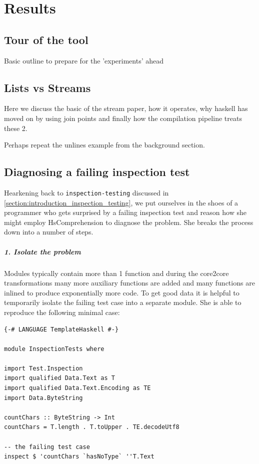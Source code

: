 \documentclass{report}
\newcommand{\mono}{\texttt}
\begin{document}
\chapter{Results}

\section{Tour of the tool}
Basic outline to prepare for the 'experiments' ahead

\section{Lists vs Streams}
Here we discuss the basic of the stream paper, how it operates, why haskell has moved on by using join points and
finally how the compilation pipeline treats these 2.

Perhaps repeat the unlines example from the background section.

\section{Diagnosing a failing inspection test}

Hearkening back to \mono{inspection-testing} discussed in \cref{section:introduction_inspection_testing}, we put
ourselves in the shoes of a programmer who gets surprised by a failing inspection test and reason how she might
employ HsComprehension to diagnose the problem. She breaks the process down into a number of steps.

\paragraph{1. Isolate the problem}
Modules typically contain more than 1 function and during the core2core transformations many more auxiliary functions are
added and many functions are inlined to produce exponentially more code. To get good data it is helpful to temporarily isolate the
failing test case into a separate module. She is able to reproduce the following minimal case:


\begin{verbatim}
{-# LANGUAGE TemplateHaskell #-}

module InspectionTests where

import Test.Inspection
import qualified Data.Text as T
import qualified Data.Text.Encoding as TE
import Data.ByteString

countChars :: ByteString -> Int
countChars = T.length . T.toUpper . TE.decodeUtf8

-- the failing test case
inspect $ 'countChars `hasNoType` ''T.Text
\end{verbatim}
\end{document}
